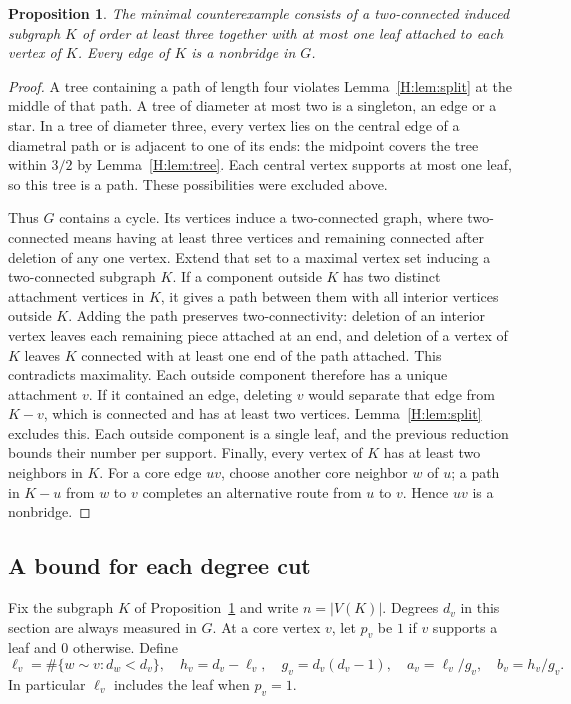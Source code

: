 \documentclass[11pt,a4paper]{article}
\newtheorem{proposition}[theorem]{Proposition}
\theoremstyle{remark}\newtheorem{remark}[theorem]{Remark}
\numberwithin{equation}{section}
\begin{document}
\begin{proposition}\label{H:prop:core}
The minimal counterexample consists of a two-connected induced subgraph
$K$ of order at least three together with at most one leaf attached to
each vertex of $K$. Every edge of $K$ is a nonbridge in $G$.
\end{proposition}
\begin{proof}
A tree containing a path of length four violates Lemma~\ref{H:lem:split}
at the middle of that path. A tree of diameter at most two is a
singleton, an edge or a star. In a tree of diameter three, every vertex
lies on the central edge of a diametral path or is adjacent to one of
its ends: the midpoint covers the tree within $3/2$ by
Lemma~\ref{H:lem:tree}. Each central vertex supports at most one leaf,
so this tree is a path. These possibilities were excluded above.

Thus $G$ contains a cycle. Its vertices induce a two-connected graph,
where two-connected means having at least three vertices and remaining
connected after deletion of any one vertex. Extend that set to a
maximal vertex set inducing a two-connected subgraph $K$. If a component
outside $K$ has two distinct attachment vertices in $K$, it gives a
path between them with all interior vertices outside $K$. Adding the
path preserves two-connectivity: deletion of an interior vertex leaves
each remaining piece attached at an end, and deletion of a vertex of
$K$ leaves $K$ connected with at least one end of the path attached.
This contradicts maximality. Each outside component therefore has a
unique attachment $v$. If it contained an edge, deleting $v$ would
separate that edge from $K-v$, which is connected and has at least
two vertices. Lemma~\ref{H:lem:split} excludes this. Each outside
component is a single leaf, and the previous reduction bounds their
number per support. Finally, every vertex of $K$ has at least two
neighbors in $K$. For a core edge $uv$, choose another core neighbor
$w$ of $u$; a path in $K-u$ from $w$ to $v$ completes an alternative
route from $u$ to $v$. Hence $uv$ is a nonbridge.
\end{proof}

\subsection{A bound for each degree cut}\label{H:sec:cuts}
Fix the subgraph $K$ of Proposition~\ref{H:prop:core} and write
$n=|V(K)|$. Degrees $d_v$ in this section are always measured in $G$.
At a core vertex $v$, let $p_v$ be $1$ if $v$ supports a leaf and
$0$ otherwise. Define
\[
 \ell_v=\#\{w\sim v:d_w<d_v\},\quad h_v=d_v-\ell_v,\quad
 g_v=d_v(d_v-1),\quad a_v=\ell_v/g_v,\quad b_v=h_v/g_v .
\]
In particular $\ell_v$ includes the leaf when $p_v=1$.
\end{document}
